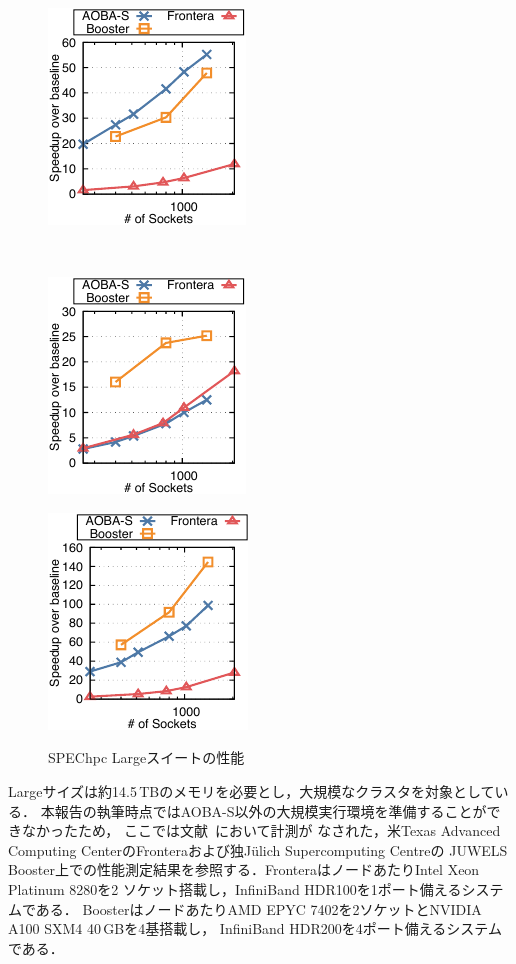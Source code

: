 ﻿\documentclass[submit,techrep,noauthor]{ipsj}
\begin{document}
\begin{figure}[tb]
\begin{minipage}[b]{0.46\hsize}
    \centering
    \includegraphics{figs/spechpc_pot3d_l.pdf}
    \label{fig:pot3d-l}
  \end{minipage} \\
  \begin{minipage}[b]{0.46\hsize}
    \centering
    \includegraphics{figs/spechpc_hpgmgfv_l.pdf}
    \label{fig:hpgmg-l}
  \end{minipage}
  \begin{minipage}[b]{0.46\hsize}
    \centering
    \includegraphics{figs/spechpc_weather_l.pdf}
    \label{fig:weather-l}
  \end{minipage}
  \caption{SPEChpc Largeスイートの性能}\label{fig:spechpc-l}
\end{figure}

Largeサイズは約14.5\,TBのメモリを必要とし，大規模なクラスタを対象としている．
本報告の執筆時点ではAOBA-S以外の大規模実行環境を準備することができなかったため，
ここでは文献~\cite{Brunst2022}において計測が
なされた，米Texas Advanced Computing CenterのFronteraおよび独J\"{u}lich Supercomputing Centreの
JUWELS Booster上での性能測定結果を参照する．FronteraはノードあたりIntel Xeon Platinum 8280を2
ソケット搭載し，InfiniBand HDR100を1ポート備えるシステムである．
BoosterはノードあたりAMD EPYC 7402を2ソケットとNVIDIA A100 SXM4 40\,GBを4基搭載し，
InfiniBand HDR200を4ポート備えるシステムである．
\end{document}

